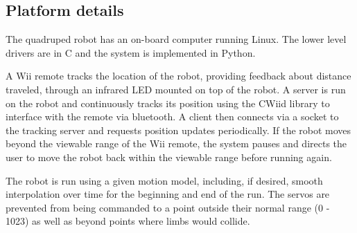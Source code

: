 \subsection{Platform details}












The quadruped robot has an on-board computer running Linux. The lower
level drivers are in C and the system is implemented in
Python. 


A Wii remote tracks the location of the robot, providing feedback
about distance traveled, through an infrared LED mounted on top of 
the robot. A server is run on the robot and continuously tracks its
position using the CWiid library\cite{cwiid} to interface with the remote
via bluetooth. A client then connects via a socket to the tracking
server and requests position updates periodically. If the robot moves 
beyond the viewable range of the Wii remote, the system pauses and
directs the user to move the robot back within the viewable range 
before running again.

The robot is run using a given motion model, including, if desired, 
smooth interpolation over time for the beginning and end of the run. 
The servos are prevented from being commanded to a point outside their
normal range (0 - 1023) as well as beyond points where limbs would collide.
